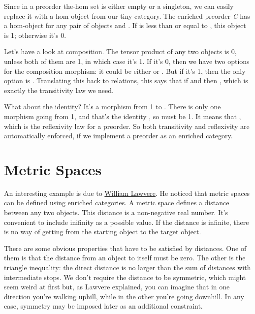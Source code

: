 Since in a preorder the-hom set is either empty or a singleton, we can
easily replace it with a hom-object from our tiny category. The enriched
preorder \emph{C} has a hom-object  for any pair of
objects  and . If  is less than or equal
to , this object is 1; otherwise it's 0.

Let's have a look at composition. The tensor product of any two objects
is 0, unless both of them are 1, in which case it's 1. If it's 0, then
we have two options for the composition morphism: it could be either
 or . But if it's 1, then the only
option is . Translating this back to relations, this says
that if  and  then
, which is exactly the transitivity law we
need.

What about the identity? It's a morphism from 1 to .
There is only one morphism going from 1, and that's the identity
, so  must be 1. It means that
, which is the reflexivity law for a
preorder. So both transitivity and reflexivity are automatically
enforced, if we implement a preorder as an enriched category.

\section{Metric Spaces}\label{metric-spaces}

An interesting example is due to
\href{http://www.tac.mta.ca/tac/reprints/articles/1/tr1.pdf}{William
Lawvere}. He noticed that metric spaces can be defined using enriched
categories. A metric space defines a distance between any two objects.
This distance is a non-negative real number. It's convenient to include
inifinity as a possible value. If the distance is infinite, there is no
way of getting from the starting object to the target object.

There are some obvious properties that have to be satisfied by
distances. One of them is that the distance from an object to itself
must be zero. The other is the triangle inequality: the direct distance
is no larger than the sum of distances with intermediate stops. We don't
require the distance to be symmetric, which might seem weird at first
but, as Lawvere explained, you can imagine that in one direction you're
walking uphill, while in the other you're going downhill. In any case,
symmetry may be imposed later as an additional constraint.

